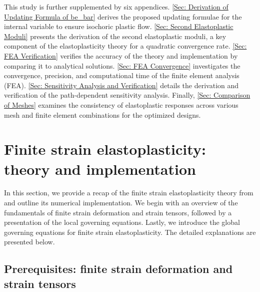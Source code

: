 \documentclass[preprint,11pt]{elsarticle}
\theoremstyle{definition}
\begin{document}
This study is further supplemented by six appendices. \ref{Sec: Derivation of Updating Formula of be_bar} derives the proposed updating formulae for the internal variable to ensure isochoric plastic flow. \ref{Sec: Second Elastoplastic Moduli} presents the derivation of the second elastoplastic moduli, a key component of the elastoplasticity theory for a quadratic convergence rate. \ref{Sec: FEA Verification} verifies the accuracy of the theory and implementation by comparing it to analytical solutions. \ref{Sec: FEA Convergence} investigates the convergence, precision, and computational time of the finite element analysis (FEA). \ref{Sec: Sensitivity Analysis and Verification} details the derivation and verification of the path-dependent sensitivity analysis. Finally, \ref{Sec: Comparison of Meshes} examines the consistency of elastoplastic responses across various mesh and finite element combinations for the optimized designs.


\section{Finite strain elastoplasticity: theory and implementation}
\label{Sec: Finite Strain Elastoplasticity}

In this section, we provide a recap of the finite strain elastoplasticity theory from \citet{simo_framework_1988-1, simo_framework_1988} and outline its numerical implementation. We begin with an overview of the fundamentals of finite strain deformation and strain tensors, followed by a presentation of the local governing equations. Lastly, we introduce the global governing equations for finite strain elastoplasticity. The detailed explanations are presented below.

\subsection{Prerequisites: finite strain deformation and strain tensors}
\end{document}
